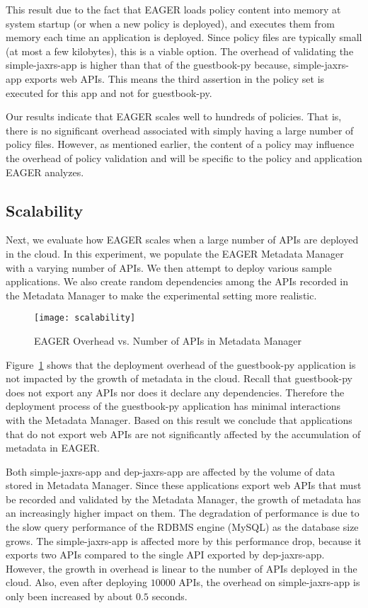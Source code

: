 This result due to the fact that EAGER loads policy content into memory at system
startup (or when a new policy is deployed), and executes them from memory each
time an application is deployed. Since policy files are typically small (at
most a few kilobytes), this is a viable option. The overhead of validating the
simple-jaxrs-app is higher than that of the guestbook-py because,
simple-jaxrs-app exports web APIs. This means the third assertion in the
policy set is executed for this app and not for guestbook-py. 

Our results indicate that EAGER scales well to hundreds of policies. That is,
there is no significant overhead associated with simply having a large number
of policy files. However, as mentioned earlier, the content of a policy may
influence the overhead of policy validation and will be specific to the policy and 
application EAGER analyzes.
 
\subsection{Scalability}
Next, we evaluate how EAGER scales when a large number of APIs are deployed 
in the cloud. In this experiment, we populate the EAGER
Metadata Manager with a varying number of APIs. We then attempt to deploy various sample 
applications. We also create random dependencies among the APIs recorded in the 
Metadata Manager to make the experimental setting more realistic.

\begin{figure}
\centering
\texttt{[image: scalability]}
\caption{EAGER Overhead vs. Number of APIs in Metadata Manager}
\label{fig:scalability}
\end{figure}

Figure~\ref{fig:scalability} shows that the deployment overhead of the 
guestbook-py application is not impacted by the growth of metadata
in the cloud. Recall that guestbook-py does not export any APIs nor does it 
declare any dependencies. Therefore the deployment process of
the guestbook-py application has minimal interactions with the 
Metadata Manager. Based on this result we conclude that applications that
do not export web APIs are not significantly affected by the accumulation 
of metadata in EAGER.

Both simple-jaxrs-app and dep-jaxrs-app are
affected by the volume of data stored in Metadata Manager. Since these applications 
export web APIs that must be recorded and validated by the Metadata Manager, 
the growth of metadata has an increasingly higher impact on them. The degradation 
of performance is due to the slow query performance of the RDBMS engine (MySQL) 
as the database size grows. The simple-jaxrs-app
is affected more by this performance drop, because it exports two APIs compared to the single API exported 
by dep-jaxrs-app. However, the growth
in overhead is linear to the number of APIs deployed in the cloud. Also,
even after deploying $10000$ APIs, the overhead on simple-jaxrs-app is only been increased by 
about $0.5$ seconds.

